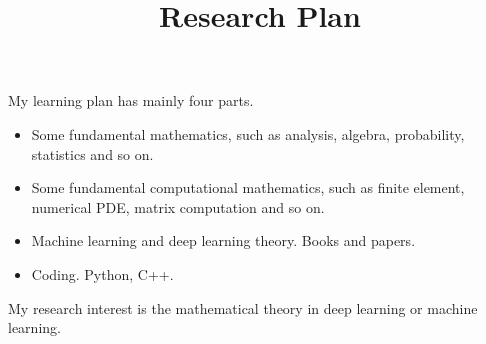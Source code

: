 \documentclass{article}
\title{Research Plan}
\begin{document}
	\maketitle
    My learning plan has mainly four parts. 
    \begin{itemize}
    	\item Some fundamental mathematics, such as analysis, algebra, probability, statistics and so on.
    	\item Some fundamental computational mathematics, such as finite element, numerical PDE, matrix computation and so on.
    	\item Machine learning and deep learning theory. Books and papers.
    	\item Coding. Python, C++.
    \end{itemize}	

    \indent My research interest is the mathematical theory in deep learning or machine learning.
\end{document}
